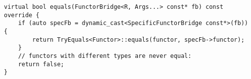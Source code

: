 \begin{lstlisting}[style=styleCXX]
virtual bool equals(FunctorBridge<R, Args...> const* fb) const override {
	if (auto specFb = dynamic_cast<SpecificFunctorBridge const*>(fb)) {
		return TryEquals<Functor>::equals(functor, specFb->functor);
	}
	// functors with different types are never equal:
	return false;
}
\end{lstlisting}




























